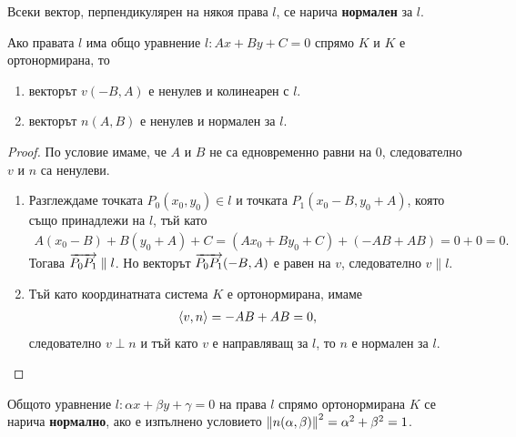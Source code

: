 \documentclass[numbers=endperiod, bibliography=totocnumbered]{scrartcl}
\begin{document}
\begin{definition}
  Всеки вектор, перпендикулярен на някоя права \( l \), се нарича \textbf{нормален} за \( l \).
\end{definition}

\begin{proposition}
  Ако правата \( l \) има общо уравнение \( l: Ax + By + C = 0 \) спрямо \( K \) и \( K \) е ортонормирана, то
  \begin{enumerate}
    \item векторът \( v(-B, A) \) е ненулев и колинеарен с \( l \).
    \item векторът \( n(A, B) \) е ненулев и нормален за \( l \).
  \end{enumerate}
\end{proposition}
\begin{proof}
  По условие имаме, че \( A \) и \( B \) не са едновременно равни на \( 0 \), следователно \( v \) и \( n \) са ненулеви.
  \begin{enumerate}
    \item Разглеждаме точката \( P_0(x_0, y_0) \in l \) и точката \( P_1(x_0 - B, y_0 + A) \), която също принадлежи на \( l \), тъй като
    \begin{align*}
      A(x_0 - B) + B(y_0 + A) + C = (Ax_0 + By_0 + C) + (-AB + AB) = 0 + 0 = 0.
    \end{align*}
     Тогава \( \overrightarrow{P_0 P_1} \parallel l \). Но векторът \( \overrightarrow{P_0 P_1}(-B, A) \) е равен на \( v \), следователно \( v \parallel l \).

    \item Тъй като координатната система \( K \) е ортонормирана, имаме
    \begin{align*}
      \left\langle v, n \right\rangle = -AB + AB = 0,
    \end{align*}
    следователно \( v \perp n \) и тъй като \( v \) е направляващ за \( l \), то \( n \) е нормален за \( l \).
  \end{enumerate}
\end{proof}

\begin{definition}
  Общото уравнение \( l: \alpha x + \beta y + \gamma = 0 \) на права \( l \) спрямо ортонормирана \( K \) се нарича \textbf{нормално}, ако е изпълнено условието \( \left\Vert n(\alpha, \beta) \right\Vert^2 = \alpha^2 + \beta^2 = 1 \).
\end{definition}
\end{document}
